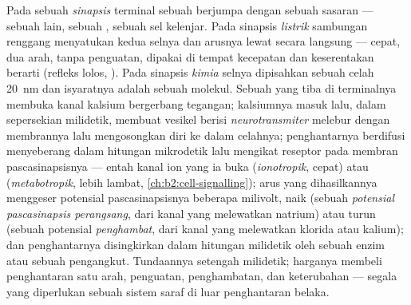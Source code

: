 \begin{definition}\label{def:b2:neurons-synapses:synapse}
Pada sebuah \emph{sinapsis} terminal sebuah  berjumpa dengan
sebuah sasaran --- sebuah  lain, sebuah , sebuah sel
kelenjar. Pada sinapsis \emph{listrik} sambungan renggang menyatukan
kedua selnya dan arusnya lewat secara langsung --- cepat, dua arah,
tanpa penguatan, dipakai di tempat kecepatan dan keserentakan berarti
(refleks lolos, ). Pada sinapsis \emph{kimia} selnya
dipisahkan sebuah celah \qty{20}{nm} dan isyaratnya adalah sebuah
molekul. Sebuah  yang tiba di terminalnya membuka kanal
kalsium bergerbang tegangan; kalsiumnya masuk lalu, dalam sepersekian
milidetik, membuat vesikel berisi \emph{neurotransmiter} melebur dengan
membrannya lalu mengosongkan diri ke dalam celahnya; penghantarnya
berdifusi menyeberang dalam hitungan mikrodetik lalu mengikat reseptor
pada membran pascasinapsisnya --- entah kanal ion yang ia buka
(\emph{ionotropik}, cepat) atau 
(\emph{metabotropik}, lebih lambat, \cref{ch:b2:cell-signalling});
arus yang dihasilkannya menggeser potensial pascasinapsisnya beberapa
milivolt, naik (sebuah \emph{potensial pascasinapsis perangsang}, dari
kanal yang melewatkan natrium) atau turun (sebuah potensial
\emph{penghambat}, dari kanal yang melewatkan klorida atau kalium); dan
penghantarnya disingkirkan dalam hitungan milidetik oleh sebuah enzim
atau sebuah pengangkut. Tundaannya setengah milidetik; harganya membeli
penghantaran satu arah, penguatan, penghambatan, dan keterubahan ---
segala yang diperlukan sebuah sistem saraf di luar penghantaran belaka.
\end{definition}

